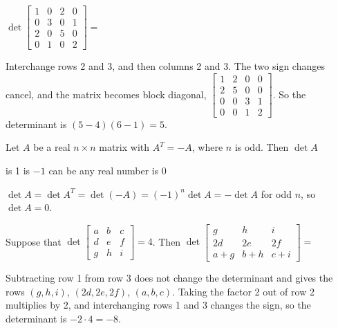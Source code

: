\begin{question}[id=det-11, marks=2]
$\det \begin{bmatrix} 1 & 0 & 2 & 0 \\ 0 & 3 & 0 & 1 \\ 2 & 0 & 5 & 0 \\ 0 & 1 & 0 & 2 \end{bmatrix} =$
\begin{solution}
Interchange rows 2 and 3, and then columns 2 and 3. The two sign changes cancel, and the matrix becomes block diagonal, $\begin{bmatrix} 1 & 2 & 0 & 0 \\ 2 & 5 & 0 & 0 \\ 0 & 0 & 3 & 1 \\ 0 & 0 & 1 & 2 \end{bmatrix}$. So the determinant is $(5 - 4)(6 - 1) = 5$.
\end{solution}
\end{question}

\begin{question}[id=det-12, marks=2]
Let $A$ be a real $n \times n$ matrix with $A^T = -A$, where $n$ is odd. Then $\det A$
\begin{options}
  \option is 1
  \option is $-1$
  \option can be any real number
  \correct is 0
\end{options}
\begin{solution}
$\det A = \det A^T = \det(-A) = (-1)^n \det A = -\det A$ for odd $n$, so $\det A = 0$.
\end{solution}
\end{question}

\begin{question}[id=det-13, marks=2]
Suppose that $\det \begin{bmatrix} a & b & c \\ d & e & f \\ g & h & i \end{bmatrix} = 4$. Then $\det \begin{bmatrix} g & h & i \\ 2d & 2e & 2f \\ a + g & b + h & c + i \end{bmatrix} =$
\begin{solution}
Subtracting row 1 from row 3 does not change the determinant and gives the rows $(g, h, i)$, $(2d, 2e, 2f)$, $(a, b, c)$. Taking the factor 2 out of row 2 multiplies by 2, and interchanging rows 1 and 3 changes the sign, so the determinant is $-2 \cdot 4 = -8$.
\end{solution}
\end{question}

